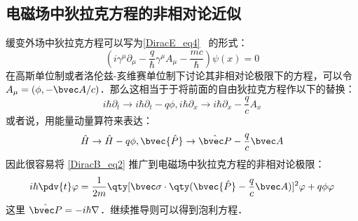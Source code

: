 \subsection{电磁场中狄拉克方程的非相对论近似}
缓变外场中狄拉克方程可以写为\autoref{DiracE_eq4}~ 的形式：
\begin{equation}
(i\gamma^\mu \partial_\mu -\frac{q}{\hbar}\gamma^\mu A_\mu - \frac{mc}{\hbar})\psi(x)=0
\end{equation}
在高斯单位制或者洛伦兹-亥维赛单位制下讨论其非相对论极限下的方程，可以令 $A_\mu=(\phi,-\bvec A/c)$．那么这相当于于将前面的自由狄拉克方程作以下的替换：
\begin{equation}
i\hbar \partial_t \rightarrow i\hbar\partial_t -q\phi, i\hbar\partial_x\rightarrow i\hbar\partial_x - \frac{q}{c}A_x
\end{equation}
或者说，用能量动量算符来表达：
\begin{equation}
\hat H\rightarrow \hat H-q\phi,\bvec{\hat P}\rightarrow \hat {\bvec P}-\frac{q}{c}\bvec A
\end{equation}
因此很容易将 \autoref{DiracB_eq2} 推广到电磁场中狄拉克方程的非相对论极限：
\begin{equation}\label{DiracB_eq3}
i\hbar\pdv{t} \varphi = \frac{1}{2m}\qty[\bvec \sigma \cdot\qty(\bvec {\hat P} - \frac{q}{c}\bvec A)]^2 \varphi + q\phi  \varphi
\end{equation}
这里 $\hat{\bvec P}=-i\hbar\nabla$．继续推导则可以得到泡利方程．